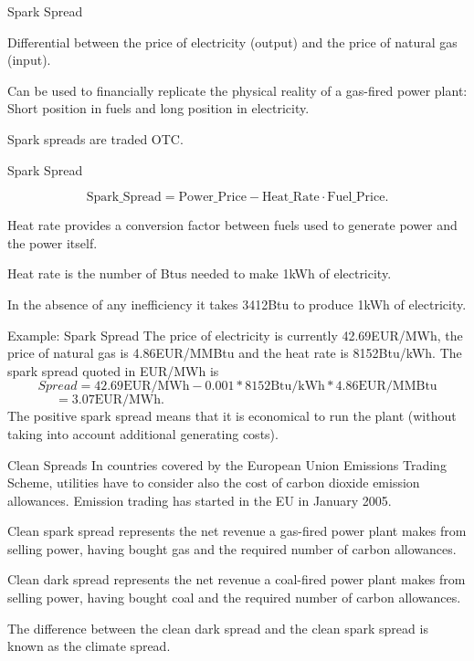 {Spark Spread}
  \item<1-> Differential between the price of electricity (output) and the price of natural gas (input).
  \item<2-> Can be used to financially replicate the physical reality of a gas-fired power plant: Short position in fuels and long position in electricity.
  \item<3-> Spark spreads are traded OTC.

{Spark Spread}

$$\text{Spark\_Spread}=\text{Power\_Price} - \text{Heat\_Rate}\cdot\text{Fuel\_Price}.$$
\vspace{0.2cm}
  \item<1-> Heat rate provides a conversion factor between fuels used to generate power and the power itself.
  \item<2-> Heat rate is the number of Btus needed to make 1kWh of electricity.
  \item<3-> In the absence of any inefficiency it takes 3412Btu to produce 1kWh of electricity.

{Example: Spark Spread}
The price of electricity is currently 42.69EUR/MWh, the price of natural gas is 4.86EUR/MMBtu and the heat rate is 8152Btu/kWh. The spark spread quoted in EUR/MWh is
$$Spread=42.69\text{EUR/MWh}-0.001\ast8152\text{Btu/kWh}\ast4.86\text{EUR/MMBtu}$$
$\,\qquad\quad\;\;=3.07\text{EUR/MWh}.$\\
\vspace{0.2cm}
The positive spark spread means that it is economical to run the plant (without taking into account additional generating costs).


{Clean Spreads}
In countries covered by the European Union Emissions Trading Scheme, utilities have to consider also the cost of carbon dioxide emission allowances. Emission trading has started in the EU in January 2005.
  \item Clean spark spread represents the net revenue a gas-fired power plant makes from selling power, having bought gas and the required number of carbon allowances.
  \item Clean dark spread represents the net revenue a coal-fired power plant makes from selling power, having bought coal and the required number of carbon allowances.
  \item The difference between the clean dark spread and the clean spark spread is known as the climate spread.

